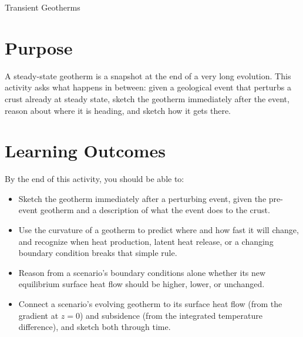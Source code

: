 \begin{activity}{Transient Geotherms}

\newcommand{\transient}[2]{%
\begin{center}
\begin{tikzpicture}[x=1cm,y=1cm]

  \begin{scope}[shift={(0,0)}]
    \draw[thick,->] (0,-1.5) -- (0,1.7) node[above] {$q$};
    \draw[thick,->] (-0.2,0) -- (5.6,0) node[right] {$t$};
    \draw[thick,->] (5.2,1.5) -- (5.2,-1.7) node[below] {$s$};
    \node at (2.5,1.9) {#1};
  \end{scope}

  \begin{scope}[shift={(0,-3)}]
    \draw[thick,->] (0,0) -- (5.2,0) node[right] {$T$};
    \draw[thick,->] (0,0) -- (0,-6.2) node[below] {$z$};

    \draw[thick, gray!80] plot[domain=0:5,samples=60] ({0.5+1.2*\x-0.07*\x*\x},{-\x});

    #2
  \end{scope}

\end{tikzpicture}
\end{center}
}%

\section*{Purpose}
A steady-state geotherm is a snapshot at the end of a very long evolution. This activity asks what happens in between: given a geological event that perturbs a crust already at steady state, sketch the geotherm immediately after the event, reason about where it is heading, and sketch how it gets there.

\section*{Learning Outcomes}
By the end of this activity, you should be able to:
\begin{itemize}
  \item Sketch the geotherm immediately after a perturbing event, given the pre-event geotherm and a description of what the event does to the crust.
  \item Use the curvature of a geotherm to predict where and how fast it will change, and recognize when heat production, latent heat release, or a changing boundary condition breaks that simple rule.
  \item Reason from a scenario's boundary conditions alone whether its new equilibrium surface heat flow should be higher, lower, or unchanged.
  \item Connect a scenario's evolving geotherm to its surface heat flow (from the gradient at $z=0$) and subsidence (from the integrated temperature difference), and sketch both through time.
\end{itemize}


\end{activity}
